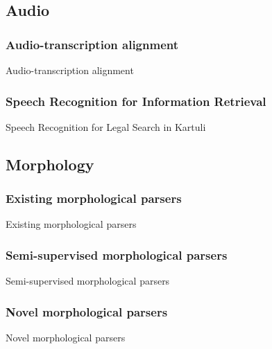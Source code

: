 \documentclass{beamer}
\begin{document}
\subsection{Audio}
\subsubsection[Alignment]{Audio-transcription alignment}

\begin{frame}
Audio-transcription alignment
\end{frame}


\subsubsection[ASR]{Speech Recognition for Information Retrieval}

\begin{frame}
Speech Recognition for Legal Search in Kartuli
\end{frame}


\subsection{Morphology}



\subsubsection[Existing]{Existing morphological parsers}

\begin{frame}
Existing morphological parsers
\end{frame}




\subsubsection[Statistical]{Semi-supervised morphological parsers}

\begin{frame}
Semi-supervised morphological parsers
\end{frame}




\subsubsection[Novel]{Novel morphological parsers}

\begin{frame}
Novel morphological parsers
\end{frame}
\end{document}
